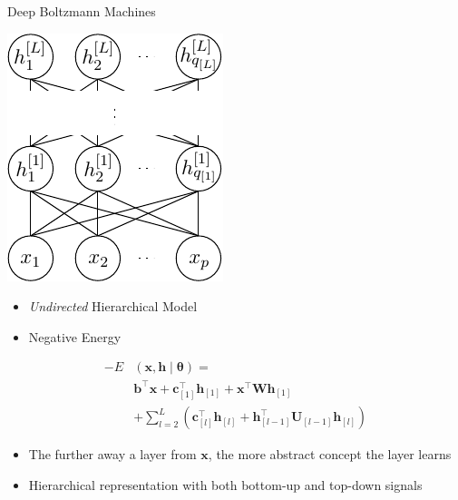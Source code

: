 \documentclass{beamer}
\newcommand{\qlay}[1]{\left[#1\right]}
\newcommand{\vect}[1]{\mathbf{#1}}
\newcommand{\vects}[1]{\boldsymbol{#1}}
\newcommand{\matr}[1]{\mathbf{#1}}
\newcommand{\vb}[0]{\vect{b}}
\newcommand{\vc}[0]{\vect{c}}
\newcommand{\vh}[0]{\vect{h}}
\newcommand{\vx}[0]{\vect{x}}
\newcommand{\mW}[0]{\matr{W}}
\newcommand{\mU}[0]{\matr{U}}
\newcommand{\TT}[0]{{\vects{\theta}}}
\begin{document}
\begin{frame}{Deep Boltzmann Machines}
\begin{minipage}{\textwidth}
\begin{minipage}{0.29\textwidth}
\centering
\includegraphics[width=\columnwidth]{dbm.pdf}
\end{minipage}
\hfill
\begin{minipage}{0.7\textwidth}
\begin{itemize}
\item \emph{Undirected} Hierarchical Model
\item Negative Energy
\end{itemize}

\vspace{-8mm}
\begin{align*}
    -E&(\vx, \vh \mid \TT) = \\
    &\vb^\top \vx +
    \vc_{\qlay{1}}^\top \vh_{\qlay{1}}
    + \vx^\top \mW \vh_{\qlay{1}} \\
    &+\sum_{l=2}^L \left(
    \vc_{\qlay{l}}^\top
    \vh_{\qlay{l}} + \vh_{\qlay{l-1}}^\top \mU_{\qlay{l-1}}
    \vh_{\qlay{l}} \right)
\end{align*}
\end{minipage}
\end{minipage}

\vspace{4mm}
\begin{minipage}{\textwidth}
\begin{itemize}
\item The further away a layer from $\vx$, the more abstract
concept the layer learns
\item Hierarchical representation with both bottom-up and
top-down signals
\end{itemize}
\end{minipage}
\end{frame}
\end{document}
